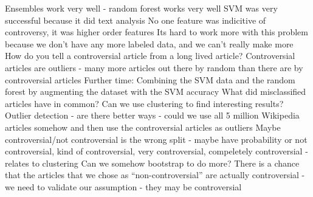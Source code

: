 \documentclass{article}
\begin{document}
Ensembles work very well - random forest works very well
SVM was very successful because it did text analysis
No one feature was indicitive of controversy, it was higher order features
Its hard to work more with this problem because we don’t have any more labeled data, and we can’t really make more
How do you tell a controversial article from a long lived article?
Controversial articles are outliers - many more articles out there by random than there are by controversial articles
Further time:
Combining the SVM data and the random forest by augmenting the dataset with the SVM accuracy
What did misclassified articles have in common?
Can we use clustering to find interesting results?
Outlier detection - are there better ways - could we use all 5 million Wikipedia articles somehow and then use the controversial articles as outliers 
Maybe controversial/not controversial is the wrong split - maybe have probability or not controversial, kind of controversial, very controversial, compeletely controversial - relates to clustering
Can we somehow bootstrap to do more? There is a chance that the articles that we chose as “non-controversial” are actually controversial - we need to validate our assumption - they may be controversial
\end{document}
